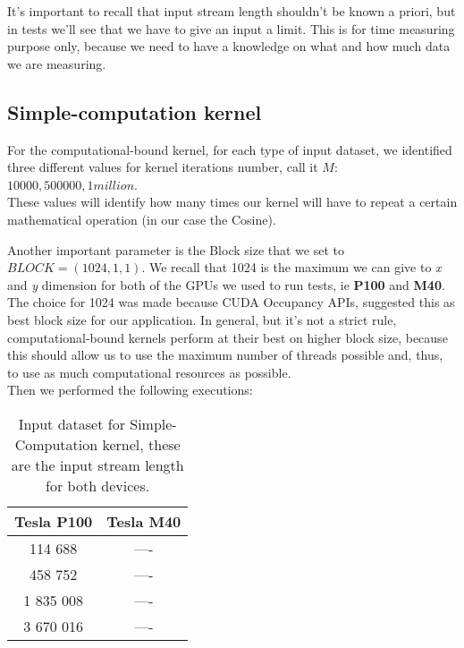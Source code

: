 It's important to recall that input stream length shouldn't be known a priori, but in tests we'll see that we have to give an input a limit. This is for time measuring purpose only, because we need to have a knowledge on what and how much data we are measuring.

\subsection{Simple-computation kernel}
For the computational-bound kernel, for each type of input dataset, we identified three different values for kernel iterations number, call it \(M\): \(10 000, 500 000, 1 million\).\\
These values will identify how many times our kernel will have to repeat a certain mathematical operation (in our case the Cosine).

Another important parameter is the Block size that we set to \(BLOCK = (1024, 1, 1)\). We recall that 1024 is the maximum we can give to \textit{x} and \textit{y} dimension for both of the GPUs we used to run tests, ie \textbf{P100} and \textbf{M40}.\\
The choice for 1024 was made because CUDA Occupancy APIs, suggested this as best block size for our application. In general, but it's not a strict rule, computational-bound kernels perform at their best on higher block size, because this should allow us to use the maximum number of threads possible and, thus, to use as much computational resources as possible.\\
Then we performed the following executions:


	\begin{table}	
		\centering
		\begin{tabular}{| c c |} 
			\hline
			\textbf{Tesla P100} & \textbf{Tesla M40} \\ [0.5ex] 
			\hline\hline
			
			114 688 & ----  \\ 
			\hline		
			458 752	& ----  \\ 
			\hline			
			1 835 008 & ---- \\
			\hline				
			3 670 016 & ---- \\
			\hline
			
			
			
		\end{tabular}
		\caption{Input dataset for Simple-Computation kernel, these are the input stream length for both devices.}	
		\label{tab:cosdata}		
	\end{table}

